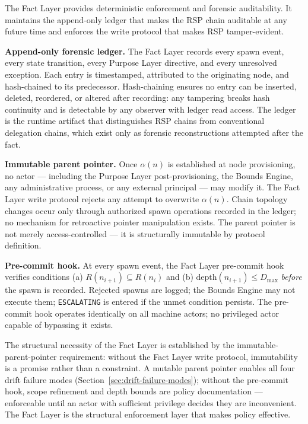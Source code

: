 The Fact Layer provides deterministic enforcement and forensic auditability. It maintains the append-only ledger that makes the RSP chain auditable at any future time and enforces the write protocol that makes RSP tamper-evident.

\medskip
\noindent\textbf{Append-only forensic ledger.} The Fact Layer records every spawn event, every state transition, every Purpose Layer directive, and every unresolved exception. Each entry is timestamped, attributed to the originating node, and hash-chained to its predecessor. Hash-chaining ensures no entry can be inserted, deleted, reordered, or altered after recording: any tampering breaks hash continuity and is detectable by any observer with ledger read access. The ledger is the runtime artifact that distinguishes RSP chains from conventional delegation chains, which exist only as forensic reconstructions attempted after the fact.

\medskip
\noindent\textbf{Immutable parent pointer.} Once $\alpha(n)$ is established at node provisioning, no actor — including the Purpose Layer post-provisioning, the Bounds Engine, any administrative process, or any external principal — may modify it. The Fact Layer write protocol rejects any attempt to overwrite $\alpha(n)$. Chain topology changes occur only through authorized spawn operations recorded in the ledger; no mechanism for retroactive pointer manipulation exists. The parent pointer is not merely access-controlled — it is structurally immutable by protocol definition.

\medskip
\noindent\textbf{Pre-commit hook.} At every spawn event, the Fact Layer pre-commit hook verifies conditions (a) $R(n_{i+1}) \subseteq R(n_i)$ and (b) $\text{depth}(n_{i+1}) \leq D_{\max}$ \emph{before} the spawn is recorded. Rejected spawns are logged; the Bounds Engine may not execute them; \texttt{ESCALATING} is entered if the unmet condition persists. The pre-commit hook operates identically on all machine actors; no privileged actor capable of bypassing it exists.

The structural necessity of the Fact Layer is established by the immutable-parent-pointer requirement: without the Fact Layer write protocol, immutability is a promise rather than a constraint. A mutable parent pointer enables all four drift failure modes (Section~\ref{sec:drift-failure-modes}); without the pre-commit hook, scope refinement and depth bounds are policy documentation — enforceable until an actor with sufficient privilege decides they are inconvenient. The Fact Layer is the structural enforcement layer that makes policy effective.

